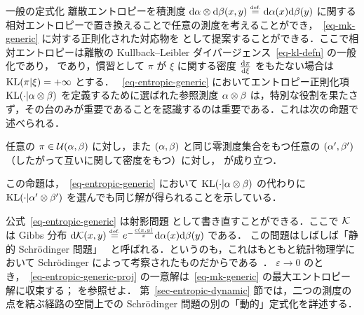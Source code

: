 \begin{rem2}{一般の定式化}
離散エントロピーを積測度 $\mathrm{d}\alpha\otimes\mathrm{d}\beta(x,y) \stackrel{\mbox{\upshape\tiny def.}}{=} \mathrm{d}\alpha(x)\mathrm{d}\beta(y)$ に関する相対エントロピーで置き換えることで任意の測度を考えることができ，~\eqref{eq-mk-generic} に対する正則化された対応物を
として提案することができる．ここで相対エントロピーは離散の Kullback--Leibler ダイバージェンス~\eqref{eq-kl-defn} の一般化であり，
であり，慣習として $\pi$ が $\xi$ に関する密度 $\frac{\mathrm{d} \pi}{\mathrm{d}\xi}$ をもたない場合は $\operatorname{KL}(\pi|\xi)=+\infty$ とする．
%
~\eqref{eq-entropic-generic} においてエントロピー正則化項 $\operatorname{KL}(\cdot|\alpha\otimes\beta)$ を定義するために選ばれた参照測度 $\alpha\otimes\beta$ は，特別な役割を果たさず，その台のみが重要であることを認識するのは重要である．これは次の命題で述べられる．

\begin{prop}
	任意の $\pi \in \mathcal{U}(\alpha,\beta)$ に対し，また $(\alpha,\beta)$ と同じ零測度集合をもつ任意の $(\alpha',\beta')$（したがって互いに関して密度をもつ）に対し，
	が成り立つ．
\end{prop}

この命題は，~\eqref{eq-entropic-generic} において $\operatorname{KL}(\cdot|\alpha\otimes\beta)$ の代わりに $\operatorname{KL}(\cdot|\alpha'\otimes\beta')$ を選んでも同じ解が得られることを示している．


公式~\eqref{eq-entropic-generic} は射影問題
\eql{\label{eq-entropic-generic-proj}
	\umin{\pi \in \Couplings(\al,\be)} \KL(\pi|\Kk),
}
として書き直すことができる．ここで $\mathcal{K}$ は Gibbs 分布 $\mathrm{d}\mathcal{K}(x,y) \stackrel{\mbox{\upshape\tiny def.}}{=} e^{-\frac{c(x,y)}{\varepsilon}} \mathrm{d}\alpha(x)\mathrm{d}\beta(y)$ である．
%
この問題はしばしば「静的 Schr\"odinger 問題」~\citep{LeonardSchroedinger,RuschendorfThomsen} と呼ばれる．というのも，これはもともと統計物理学において Schr\"odinger によって考察されたものだからである~\citep{Schroedinger31}．
%
$\varepsilon \rightarrow 0$ のとき，~\eqref{eq-entropic-generic-proj} の一意解は~\eqref{eq-mk-generic} の最大エントロピー解に収束する；\citep{leonard2012schrodinger,2017-carlier-SIMA} を参照せよ．
%
第~\ref{sec-entropic-dynamic} 節では，二つの測度の点を結ぶ経路の空間上での Schr\"odinger 問題の別の「動的」定式化を詳述する．
\end{rem2}

